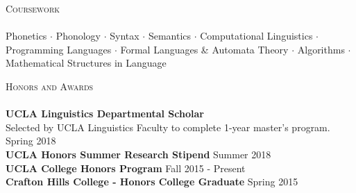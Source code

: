 \documentclass[]{article}
\newcommand{\lineunder} {
    \vspace*{-8pt} \\
    \hspace*{-18pt} \hrulefill \\
}
\newcommand{\header} [1] {
    {\hspace*{-18pt}\vspace*{6pt} \textsc{#1}}
    \vspace*{-6pt} \lineunder
}
\begin{document}
\header{Coursework}
Phonetics $\cdot$ Phonology $\cdot$ Syntax $\cdot$ Semantics $\cdot$ Computational Linguistics $\cdot$ Programming Languages $\cdot$ Formal Languages \& Automata Theory $\cdot$ Algorithms $\cdot$ Mathematical Structures in Language
\vspace*{2mm}

\header{Honors and Awards}
\textbf{UCLA Linguistics Departmental Scholar}\\
Selected by UCLA Linguistics Faculty to complete 1-year master’s program. \hfill Spring 2018\\
\vspace*{1mm}
\textbf{UCLA Honors Summer Research Stipend} \hfill Summer 2018\\
\vspace*{1mm}
\textbf{UCLA College Honors Program}
\hfill Fall 2015 - Present\\
\vspace*{1mm}
\textbf{Crafton Hills College - Honors College Graduate}
\hfill Spring 2015\\
\vspace*{1mm}
\end{document}
